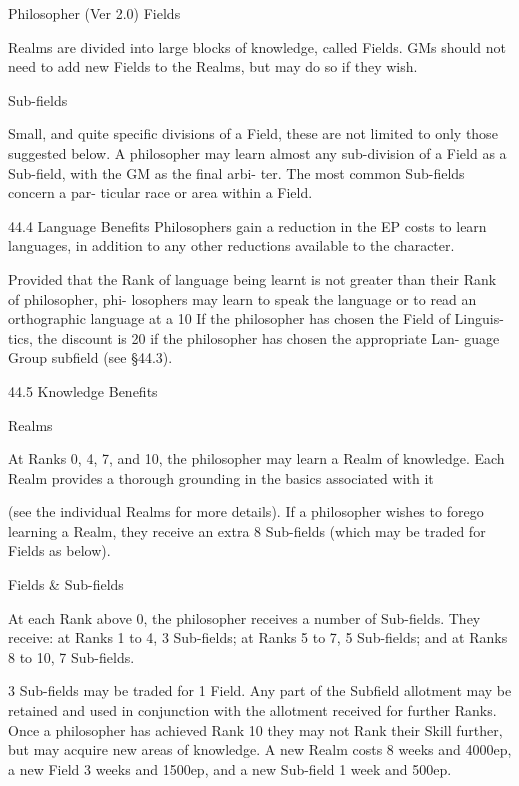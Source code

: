\begin{Chapter}{Philosopher (Ver 2.0)}
Fields 

Realms are divided into large blocks of knowledge, 
called  Fields.  GMs  should  not  need  to  add  new 
Fields to the Realms, but may do so if they wish. 

Sub-fields 

Small, and quite specific divisions of a Field, these 
are  not  limited  to  only  those  suggested  below.  A 
philosopher may learn almost any sub-division of a 
Field as a Sub-field, with the GM as the final arbi-
ter.  The  most  common  Sub-fields  concern  a  par-
ticular race or area within a Field. 

44.4 Language Benefits 
Philosophers  gain  a  reduction  in  the  EP  costs  to 
learn languages, in addition to any other reductions 
available to the character. 

Provided that the Rank of language  being learnt is 
not  greater  than  their  Rank  of  philosopher,  phi-
losophers  may  learn  to  speak  the  language  or  to 
read  an  orthographic  language  at  a  10%
If the philosopher has chosen the Field of Linguis-
tics, the discount is 20%
if the philosopher has chosen the appropriate Lan-
guage Group subfield (see §44.3). 

44.5 Knowledge Benefits 

Realms 

At Ranks 0, 4, 7, and 10, the philosopher may learn 
a  Realm  of  knowledge.  Each  Realm  provides  a 
thorough grounding in the basics associated with it 

(see  the  individual  Realms  for  more  details).  If  a 
philosopher  wishes  to  forego  learning  a  Realm, 
they  receive  an  extra  8  Sub-fields  (which  may  be 
traded for Fields as below). 

Fields \& Sub-fields 

At  each  Rank  above  0,  the  philosopher  receives  a 
number  of  Sub-fields.  They  receive:  at Ranks 1 to 
4, 3  Sub-fields;  at Ranks 5  to 7, 5  Sub-fields; and 
at Ranks 8 to 10, 7 Sub-fields. 

3 Sub-fields may be traded for 1 Field. Any part of 
the Subfield allotment may be retained and used in 
conjunction with the allotment received for further 
Ranks.  Once  a  philosopher  has  achieved  Rank  10 
they  may  not  Rank  their  Skill  further,  but  may 
acquire  new  areas  of  knowledge.  A  new  Realm 
costs  8  weeks  and  4000ep,  a  new  Field  3  weeks 
and  1500ep,  and  a  new  Sub-field  1  week  and 
500ep. 


\end{Chapter}
